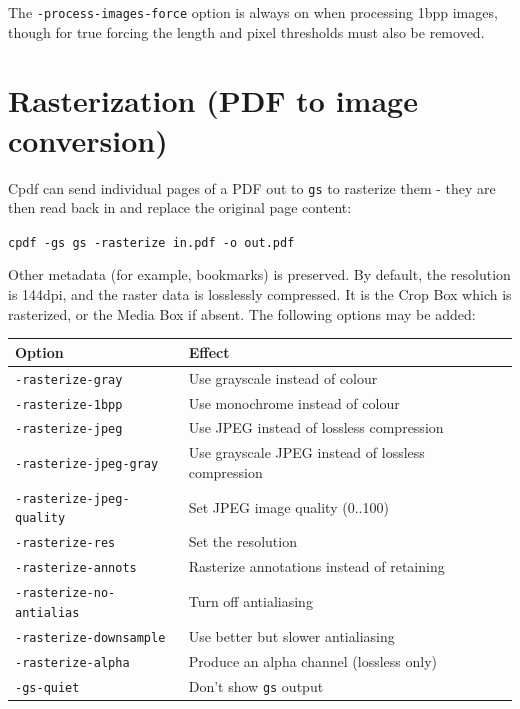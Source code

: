 \documentclass{book}
\begin{document}
\noindent The \texttt{-process-images-force} option is always on when processing 1bpp images, though for true forcing the length and pixel thresholds must also be removed.

\section{Rasterization (PDF to image conversion)}

Cpdf can send individual pages of a PDF out to \texttt{gs} to rasterize them - they are then read back in and replace the original page content:

  \begin{framed}
  \noindent\small\verb!cpdf -gs gs -rasterize in.pdf -o out.pdf!
  \end{framed}

\noindent Other metadata (for example, bookmarks) is preserved. By default, the resolution is 144dpi, and the raster data is losslessly compressed. It is the Crop Box which is rasterized, or the Media Box if absent. The following options may be added:

\bigskip
\noindent\begin{tabular}{lp{8cm}l}
Option & Effect\\\hline
{\small\texttt{-rasterize-gray}} & Use grayscale instead of colour \\
{\small\texttt{-rasterize-1bpp}} & Use monochrome instead of colour\\
{\small\texttt{-rasterize-jpeg}} & Use JPEG instead of lossless compression\\
{\small\texttt{-rasterize-jpeg-gray}} & Use grayscale JPEG instead of lossless compression\\
{\small\texttt{-rasterize-jpeg-quality}} & Set JPEG image quality (0..100)\\
{\small\texttt{-rasterize-res}} & Set the resolution\\
{\small\texttt{-rasterize-annots}} & Rasterize annotations instead of retaining\\
{\small\texttt{-rasterize-no-antialias}} & Turn off antialiasing\\
{\small\texttt{-rasterize-downsample}} & Use better but slower antialiasing\\
{\small\texttt{-rasterize-alpha}} & Produce an alpha channel (lossless only)\\
{\small\texttt{-gs-quiet}} & Don't show \texttt{gs} output\\
\end{tabular}
\bigskip
\end{document}
